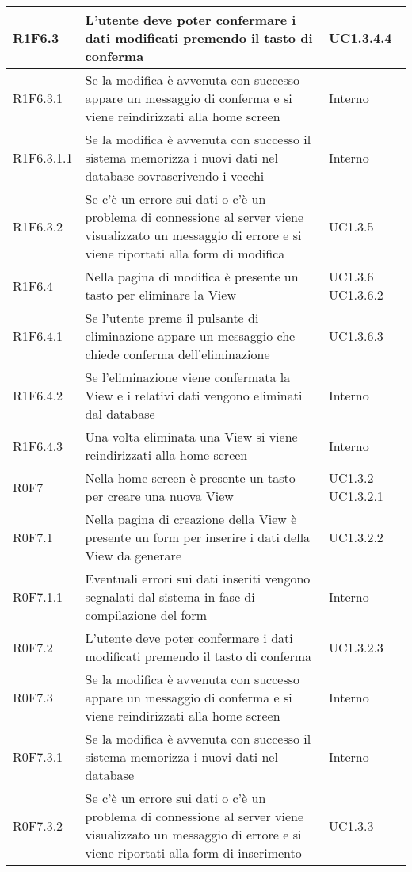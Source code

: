 \begin{center}
\begin{longtable}{| p{2cm} | p{8cm} | p{2cm} |}
		\hline
		R1F6.3  &  L'utente deve poter confermare i dati modificati premendo il tasto di conferma  &  UC1.3.4.4 \\
		\hline
		R1F6.3.1  &  Se la modifica è avvenuta con successo appare un messaggio di conferma e si viene reindirizzati alla home screen  &  Interno \\
		\hline
		R1F6.3.1.1  &  Se la modifica è avvenuta con successo il sistema memorizza i nuovi dati nel database sovrascrivendo i vecchi  &  Interno \\
		\hline
		R1F6.3.2  &  Se c'è un errore sui dati o c'è un problema di connessione al server viene visualizzato un messaggio di errore e si viene riportati alla form di modifica  &  UC1.3.5 \\
		\hline
		R1F6.4  &  Nella pagina di modifica è presente un tasto per eliminare la View  &  UC1.3.6 \newline UC1.3.6.2 \\
		\hline
		R1F6.4.1  &  Se l'utente preme il pulsante di eliminazione appare un messaggio che chiede conferma dell'eliminazione  &  UC1.3.6.3 \\
		\hline
		R1F6.4.2  &  Se l'eliminazione viene confermata la View e i relativi dati vengono eliminati dal database  &  Interno \\
		\hline
		R1F6.4.3  &  Una volta eliminata una View si viene reindirizzati alla home screen  &  Interno \\
		\hline
		R0F7  &  Nella home screen è presente un tasto per creare una nuova View  &  UC1.3.2 \newline UC1.3.2.1 \\
		\hline
		R0F7.1  &  Nella pagina di creazione della View è presente un form per inserire i dati della View da generare  &  UC1.3.2.2 \\
		\hline
		R0F7.1.1  &  Eventuali errori sui dati inseriti vengono segnalati dal sistema in fase di compilazione del form  &  Interno \\
		\hline
		R0F7.2  &  L'utente deve poter confermare i dati modificati premendo il tasto di conferma  &  UC1.3.2.3 \\
		\hline
		R0F7.3  &  Se la modifica è avvenuta con successo appare un messaggio di conferma e si viene reindirizzati alla home screen  &  Interno \\
		\hline
		R0F7.3.1  &  Se la modifica è avvenuta con successo il sistema memorizza i nuovi dati nel database  &  Interno \\
		\hline
		R0F7.3.2  &  Se c'è un errore sui dati o c'è un problema di connessione al server viene visualizzato un messaggio di errore e si viene riportati alla form di inserimento  &  UC1.3.3 \\

\end{longtable}
\end{center}
